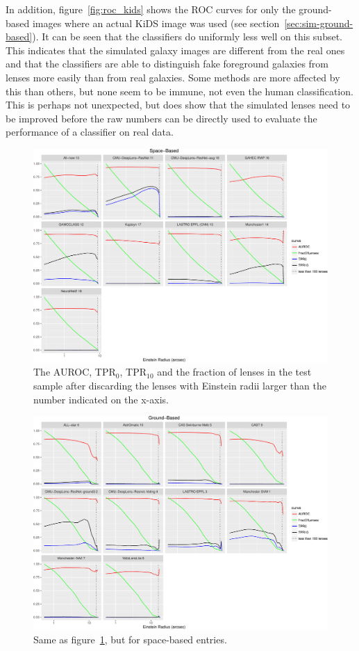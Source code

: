 \documentclass[useAMS,usenatbib]{mnras}
\begin{document}
In addition, figure~\ref{fig:roc_kids} shows the ROC curves for only the ground-based images where an actual KiDS image was used (see section~\ref{sec:sim-ground-based}).  It can be seen that the classifiers do uniformly less well on this subset.  This indicates that the simulated galaxy images are different from the real ones and that the classifiers are able to distinguish fake foreground galaxies from lenses more easily than from real galaxies.  Some methods are more affected by this than others, but none seem to be immune, not even the human classification. This is perhaps not unexpected, but does show that the simulated lenses need to be improved before the raw numbers can be directly used to evaluate the performance of a classifier on real data.


\begin{figure}
 \includegraphics[width=2\columnwidth]{figures/einstein_space.pdf}
 \caption{The AUROC, TPR$_0$, TPR$_{10}$ and the fraction of lenses in the test sample after discarding the lenses with Einstein radii larger than the number indicated on the x-axis. }
 \label{fig:einstein_space}
\end{figure}

\begin{figure}
 \includegraphics[width=2\columnwidth]{figures/einstein_ground.pdf}
 \caption{Same as figure~\ref{fig:einstein_space}, but for space-based entries.}
 \label{fig:einstein_ground}
\end{figure}
\end{document}
